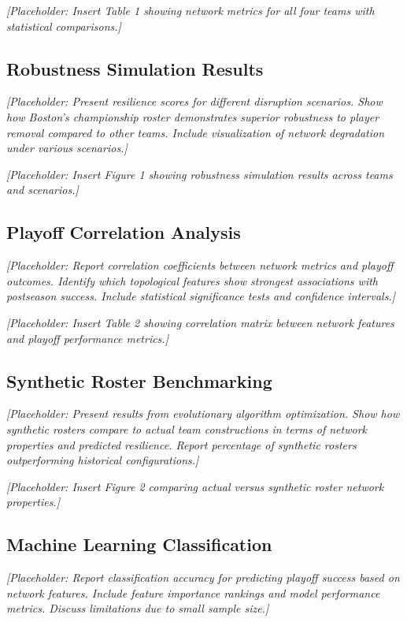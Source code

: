 \documentclass[11pt]{article}
\begin{document}
\textit{[Placeholder: Insert Table 1 showing network metrics for all four teams with statistical comparisons.]}

\subsection{Robustness Simulation Results}

\textit{[Placeholder: Present resilience scores for different disruption scenarios. Show how Boston's championship roster demonstrates superior robustness to player removal compared to other teams. Include visualization of network degradation under various scenarios.]}

\textit{[Placeholder: Insert Figure 1 showing robustness simulation results across teams and scenarios.]}

\subsection{Playoff Correlation Analysis}

\textit{[Placeholder: Report correlation coefficients between network metrics and playoff outcomes. Identify which topological features show strongest associations with postseason success. Include statistical significance tests and confidence intervals.]}

\textit{[Placeholder: Insert Table 2 showing correlation matrix between network features and playoff performance metrics.]}

\subsection{Synthetic Roster Benchmarking}

\textit{[Placeholder: Present results from evolutionary algorithm optimization. Show how synthetic rosters compare to actual team constructions in terms of network properties and predicted resilience. Report percentage of synthetic rosters outperforming historical configurations.]}

\textit{[Placeholder: Insert Figure 2 comparing actual versus synthetic roster network properties.]}

\subsection{Machine Learning Classification}

\textit{[Placeholder: Report classification accuracy for predicting playoff success based on network features. Include feature importance rankings and model performance metrics. Discuss limitations due to small sample size.]}
\end{document}
